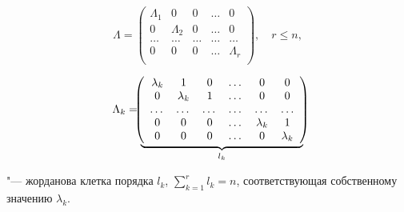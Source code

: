 \begin{equation*}

\Lambda= 

    \left(

	    \begin{array}{cccccc}

              \Lambda_1 & 0 & 0&  \dots  &0\\

	      0& \Lambda_2 & 0 &  \dots  &0\\

	       \dots  &  \dots  &  \dots &  \dots  & \dots \\

	      0& 0 & 0 &  \dots  &\Lambda_r\\

            \end{array}

    \right), \quad r\leq n,

\end{equation*}

\begin{equation*}

\Lambda_k=

  \underbrace{

  \mkern-10mu

    \left(

	    \begin{array}{cccccc}

              \lambda_k & 1 & 0&  \dots  &0 &0\\

	      0& \lambda_k & 1 &  \dots  &0 &0\\

	       \dots  &  \dots  &  \dots &  \dots  & \dots  & \dots \\

	      0& 0& 0 &  \dots  &\lambda_k&1 \\

	      0& 0& 0 &  \dots  &0&\lambda_k \\

            \end{array}

    \right)

    \mkern-10mu

   }_{l_k}

\end{equation*}

 "---  жорданова клетка порядка $l_k$, $\sum_{k=1}^{r} l_k =n$, соответствующая собственному значению $\lambda_k$. 


